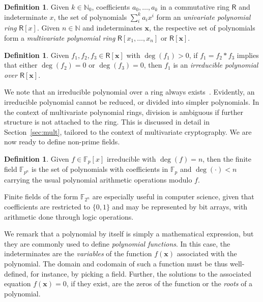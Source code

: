 \documentclass[12pt, a4paper, oneside]{memoir}
\theoremstyle{definition}
\newtheorem{definition}[theorem]{Definition}
\begin{document}
\begin{definition}
  Given $k \in \mathbb{N}_{0}$, coefficients $a_{0}, \dots, a_{k}$ in a commutative ring $\mathsf{R}$ and indeterminate $x$, the set of polynomials $\sum_{i}^{k} a_{i} x^{i}$ form an \emph{univariate polynomial ring} $\mathsf{R}[x]$. Given $n \in \mathbb{N}$ and indeterminates $\mathbf{x}$, the respective set of polynomials form a \emph{multivariate polynomial ring} $\mathsf{R}[x_{1}, \dots, x_{n}]$ or $\mathsf{R}[\mathbf{x}]$.
\end{definition}

\begin{definition}
  Given $f_{1}, f_{2}, f_{3} \in \mathsf{R}[\mathbf{x}]$ with $\deg(f_{1}) > 0$, if $f_{1} = f_{2} \ast f_{3}$ implies that either $\deg(f_{2}) = 0$ or $\deg(f_{3}) = 0$, then $f_{1}$ is an \emph{irreducible polynomial over $\mathsf{R}[\mathbf{x}]$}.
\end{definition}

We note that an irreducible polynomial over a ring always exists~\cite[Remark 2.1.25]{Mullen:2013}. Evidently, an irreducible polynomial cannot be reduced, or divided into simpler polynomials. In the context of multivariate polynomial rings, division is ambiguous if further structure is not attached to the ring. This is discussed in detail in Section~\ref{sec:mult}, tailored to the context of multivariate cryptography. We are now ready to define non-prime fields.

\begin{definition}
  Given $f \in \mathbb{F}_{p}[x]$ irreducible with $\deg(f) = n$, then the finite field $\mathbb{F}_{p^{n}}$ is the set of polynomials with coefficients in $\mathbb{F}_{p}$ and $\deg(\cdot) < n$ carrying the usual polynomial arithmetic operations modulo $f$.
\end{definition}

Finite fields of the form $\mathbb{F}_{2^{n}}$ are especially useful in computer science, given that coefficients are restricted to $\{0, 1\}$ and may be represented by bit arrays, with arithmetic done through logic operations.

We remark that a polynomial by itself is simply a mathematical expression, but they are commonly used to define \emph{polynomial functions}. In this case, the indeterminates are the \emph{variables} of the function $f(\mathbf{x})$ associated with the polynomial. The domain and codomain of such a function must be thus well-defined, for instance, by picking a field. Further, the solutions to the associated equation $f(\mathbf{x}) = 0$, if they exist, are the zeros of the function or the \emph{roots} of a polynomial. 
\end{document}
